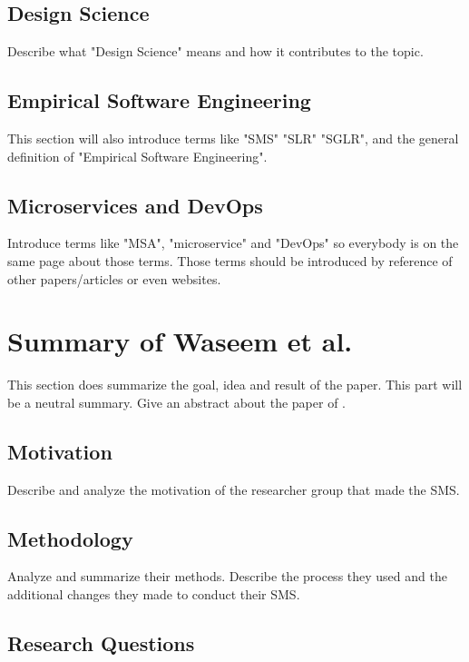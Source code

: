\subsection{Design Science}

Describe what "Design Science" means and how it contributes to the
topic.


\subsection{Empirical Software Engineering}

This section will also introduce terms like "SMS" "SLR" "SGLR", and the general
definition of "Empirical Software Engineering".


\subsection{Microservices and DevOps}

Introduce terms
like "MSA", "microservice" and "DevOps" so everybody is on the
same page about those terms. Those terms should be introduced by reference
of other papers/articles or even websites.

\section{Summary of Waseem et al.}

This section does summarize the goal, idea and result of the paper.
This part will be a neutral summary.
Give an abstract about the paper of \cite{waseem:SMS}.

\subsection{Motivation}

Describe and analyze the motivation of the researcher group that made the SMS.

\subsection{Methodology}

Analyze and summarize their methods. Describe the process they used and the
additional changes they made to conduct their SMS.

\subsection{Research Questions}

